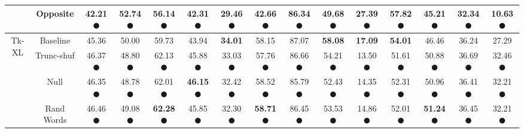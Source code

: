 \begin{table}[t]
{\begin{tabular}{@{}ccccccccccccccc@{}}
& Opposite & \textbf{42.21} \textcolor{green!60!black}{$\CIRCLE$} & 52.74 \textcolor{red!60!black}{$\CIRCLE$} & \textbf{56.14} \textcolor{green!60!black}{$\CIRCLE$} & \textbf{42.31} \textcolor{green!60!black}{$\CIRCLE$} & 29.46 \textcolor{red!60!black}{$\CIRCLE$} & \textbf{42.66} \textcolor{green!60!black}{$\CIRCLE$} & 86.34 \textcolor{green!60!black}{$\CIRCLE$} & 49.68 \textcolor{red!60!black}{$\CIRCLE$} & \textbf{27.39} \textcolor{green!60!black}{$\CIRCLE$} & \textbf{57.82} \textcolor{green!60!black}{$\CIRCLE$} & 45.21 \textcolor{green!60!black}{$\CIRCLE$} & \textbf{32.34} \textcolor{green!60!black}{$\CIRCLE$} & 10.63 \textcolor{red!60!black}{$\CIRCLE$} \\
\midrule
\multirow{5}{*}{Tk-XL} 
& Baseline &45.36&	50.00&	59.73&	43.94&	\textbf{34.01} &	58.15&	87.07&	\textbf{58.08} &	\textbf{17.09}&	\textbf{54.01} &	46.46&	36.24&	27.29 \\
& Trunc-shuf & 46.37 \textcolor{green!60!black}{$\CIRCLE$} & 48.80 \textcolor{red!60!black}{$\CIRCLE$} & 62.13 \textcolor{green!60!black}{$\CIRCLE$} & 45.88 \textcolor{green!60!black}{$\CIRCLE$} & 33.03 \textcolor{red!60!black}{$\CIRCLE$} & 57.76 \textcolor{red!60!black}{$\CIRCLE$} & 86.66 \textcolor{red!60!black}{$\CIRCLE$} & 54.21 \textcolor{red!60!black}{$\CIRCLE$} & 13.50 \textcolor{red!60!black}{$\CIRCLE$} & 51.61 \textcolor{red!60!black}{$\CIRCLE$} & 50.88 \textcolor{green!60!black}{$\CIRCLE$} & 36.69 \textcolor{green!60!black}{$\CIRCLE$} & 32.46 \textcolor{green!60!black}{$\CIRCLE$} \\
& Null & 46.35 \textcolor{green!60!black}{$\CIRCLE$} & 48.78 \textcolor{red!60!black}{$\CIRCLE$} & 62.01 \textcolor{green!60!black}{$\CIRCLE$} & \textbf{46.15} \textcolor{green!60!black}{$\CIRCLE$} & 32.42 \textcolor{red!60!black}{$\CIRCLE$} & 58.52 \textcolor{green!60!black}{$\CIRCLE$} & 85.79 \textcolor{red!60!black}{$\CIRCLE$} & 52.43 \textcolor{red!60!black}{$\CIRCLE$} & 14.35 \textcolor{red!60!black}{$\CIRCLE$} & 52.31 \textcolor{red!60!black}{$\CIRCLE$} & 50.96 \textcolor{green!60!black}{$\CIRCLE$} & 36.41 \textcolor{green!60!black}{$\CIRCLE$} & 32.21 \textcolor{green!60!black}{$\CIRCLE$} \\
& Rand Words & 46.46 \textcolor{green!60!black}{$\CIRCLE$} & 49.08 \textcolor{red!60!black}{$\CIRCLE$} & \textbf{62.28} \textcolor{green!60!black}{$\CIRCLE$} & 45.85 \textcolor{green!60!black}{$\CIRCLE$} & 32.30 \textcolor{red!60!black}{$\CIRCLE$} & \textbf{58.71} \textcolor{green!60!black}{$\CIRCLE$} & 86.45 \textcolor{red!60!black}{$\CIRCLE$} & 53.53 \textcolor{red!60!black}{$\CIRCLE$} & 14.86 \textcolor{red!60!black}{$\CIRCLE$} & 52.01 \textcolor{red!60!black}{$\CIRCLE$} & \textbf{51.24} \textcolor{green!60!black}{$\CIRCLE$} & 36.45 \textcolor{green!60!black}{$\CIRCLE$} & 32.21 \textcolor{green!60!black}{$\CIRCLE$} \\

\end{tabular}}
\end{table}
